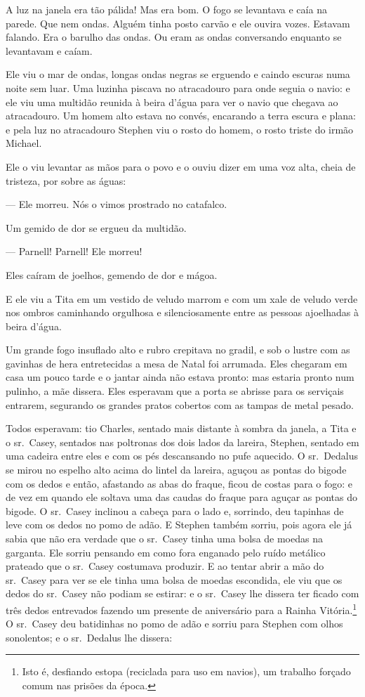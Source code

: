 A luz na janela era tão pálida! Mas era bom. O fogo se levantava e caía
na parede. Que nem ondas. Alguém tinha posto carvão e ele ouvira vozes.
Estavam falando. Era o barulho das ondas. Ou eram as ondas conversando
enquanto se levantavam e caíam.

Ele viu o mar de ondas, longas ondas negras se erguendo e caindo escuras
numa noite sem luar. Uma luzinha piscava no atracadouro para onde seguia
o navio: e ele viu uma multidão reunida à beira d’água
para ver o navio que chegava ao atracadouro. Um homem alto estava no
convés, encarando a terra escura e plana: e pela luz no atracadouro
Stephen viu o rosto do homem, o rosto triste do irmão Michael.

Ele o viu levantar as mãos para o povo e o ouviu dizer em uma voz alta,
cheia de tristeza, por sobre as águas:

 --- Ele morreu. Nós o vimos prostrado no catafalco. 

Um gemido de dor se ergueu da multidão.

 --- Parnell! Parnell! Ele morreu!

Eles caíram de joelhos, gemendo de dor e mágoa.

E ele viu a Tita em um vestido de veludo marrom e com um xale de veludo
verde nos ombros caminhando orgulhosa e silenciosamente entre as
pessoas ajoelhadas à beira d’água.

\medskip

Um grande fogo insuflado alto e rubro crepitava no gradil, e sob o lustre
com as gavinhas de hera entretecidas a mesa de Natal foi arrumada. Eles
chegaram em casa um pouco tarde e o jantar ainda não estava
pronto: mas estaria pronto num pulinho, a mãe dissera. Eles esperavam
que a porta se abrisse para os serviçais entrarem, segurando os grandes
pratos cobertos com as tampas de metal pesado.

Todos esperavam: tio Charles, sentado mais distante à sombra da janela,
a Tita e o sr.~Casey, sentados nas poltronas dos dois lados da lareira, 
Stephen, sentado em uma cadeira entre eles e com os pés descansando no
pufe aquecido. O sr.~Dedalus se mirou no espelho alto acima do lintel
da lareira, aguçou as pontas do bigode com os dedos e então, afastando
as abas do fraque, ficou de costas para o fogo: e de vez em quando ele
soltava uma das caudas do fraque para aguçar as pontas do bigode. O sr.~Casey 
inclinou a cabeça para o lado e, sorrindo, deu tapinhas de leve
com os dedos no pomo de adão. E Stephen também sorriu, pois agora ele
já sabia que não era verdade que o sr.~Casey tinha uma bolsa de moedas
na garganta. Ele sorriu pensando em como fora enganado pelo ruído
metálico prateado que o sr.~Casey costumava produzir. E ao tentar abrir
a mão do sr.~Casey para ver se ele tinha uma bolsa de moedas escondida,
ele viu que os dedos do sr.~Casey não podiam se estirar: e o sr.~Casey
lhe dissera ter ficado com três dedos entrevados fazendo um presente de
aniversário para a Rainha Vitória.\footnote{ Isto é, desfiando estopa
(reciclada para uso em navios), um trabalho forçado comum nas prisões
da época.} O sr.~Casey deu batidinhas no pomo de adão e sorriu para
Stephen com olhos sonolentos; e o sr.~Dedalus lhe dissera:

